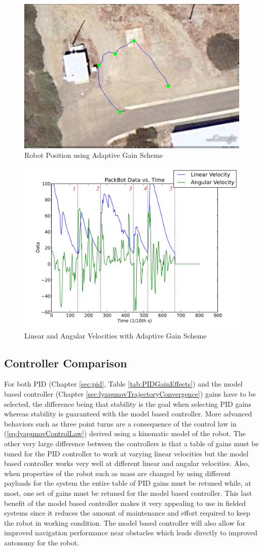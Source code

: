 \begin{figure}[ht!]
	\centering
	\includegraphics[width=.5\textwidth]{images/20100929_1448_GE_KF_waypts}
	\caption{Robot Position using Adaptive Gain Scheme}
	\label{fig:resultsLyapunovPositionAdaptive}
\end{figure}

\begin{figure}[ht!]
	\centering
	\includegraphics[width=.5\textwidth]{images/20100929_1448_pbtx}
	\caption{Linear and Angular Velocities with Adaptive Gain Scheme}
	\label{fig:resultsLyapunovVelocitiesAdaptive}
\end{figure}

\subsection{Controller Comparison}
\label{sec:controllerComparison}
For both PID (Chapter \ref{sec:pid}, Table \ref{tab:PIDGainEffects}) and the model based controller (Chapter \ref{sec:lyapunovTrajectoryConvergence}) gains have to be selected, the difference being that stability is the goal when selecting PID gains whereas stability is guaranteed with the model based controller. More advanced behaviors such as three point turns are a consequence of the control law in (\ref{eq:lyapunovControlLaw}) derived using a kinematic model of the robot. The other very large difference between the controllers is that a table of gains must be tuned for the PID controller to work at varying linear velocities but the model based controller works very well at different linear and angular velocities. Also, when properties of the robot such as mass are changed by using different payloads for the system the entire table of PID gains must be retuned while, at most, one set of gains must be retuned for the model based controller. This last benefit of the model based controller makes it very appealing to use in fielded systems since it reduces the amount of maintenance and effort required to keep the robot in working condition. The model based controller will also allow for improved navigation performance near obstacles which leads directly to improved autonomy for the robot.
